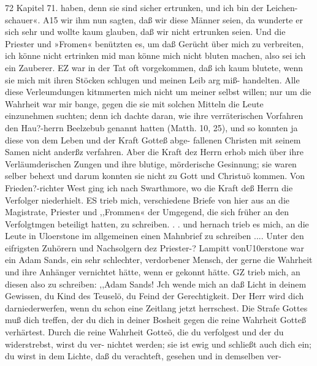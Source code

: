 72 Kapitel 71.
haben, denn sie sind sicher ertrunken, und ich bin der Leichen-
schauer«. A15 wir ihm nun sagten, daß wir diese Männer seien,
da wunderte er sich sehr und wollte kaum glauben, daß wir nicht
ertrunken seien. Und die Priester und »Fromen« benützten es, um
daß Gerücht über mich zu verbreiten, ich könne nicht ertrinken mid
man könne mich nicht bluten machen, also sei ich ein Zauberer.
EZ war in der Tat oft vorgekommen, daß ich kaum blutete, wenn
sie mich mit ihren Stöcken schlugen und meinen Leib arg miß-
handelten. Alle diese Verleumdungen kitmmerten mich nicht um
meiner selbst willen; nur um die Wahrheit war mir bange,
gegen die sie mit solchen Mitteln die Leute einzunehmen suchten;
denn ich dachte daran, wie ihre verräterischen Vorfahren den
Hau?-herrn Beelzebub genannt hatten (Matth. 10, 25), und so
konnten ja diese von dem Leben und der Kraft Gotteß abge-
fallenen Christen mit seinem Samen nicht anderßz verfahren. Aber
die Kraft dez Herrn erhob mich über ihre Verläumderischen Zungen
und ihre blutige, mörderische Gesinnung; sie waren selber behext
und darum konnten sie nicht zu Gott und Christuö kommen.
Von Frieden?-richter West ging ich nach Swarthmore, wo
die Kraft deß Herrn die Verfolger niederhielt. ES trieb mich,
verschiedene Briefe von hier aus an die Magistrate, Priester und
,,Frommen« der Umgegend, die sich früher an den Verfolgtmgen
beteiligt hatten, zu schreiben. . . und hernach trieb es mich, an
die Leute in Uloerstone im allgemeinen einen Mahnbrief zu
schreiben ....
Unter den eifrigsten Zuhörern und Nachsolgern dez Priester-?
Lampitt vonU10erstone war ein Adam Sands, ein sehr schlechter,
verdorbener Mensch, der gerne die Wahrheit und ihre Anhänger
vernichtet hätte, wenn er gekonnt hätte. GZ trieb mich, an diesen
also zu schreiben:
,,Adam Sands!
Jch wende mich an daß Licht in deinem Gewissen, du Kind
des Teuselö, du Feind der Gerechtigkeit. Der Herr wird dich
darniederwerfen, wenn du schon eine Zeitlang jetzt herrschest. Die
Strafe Gottes muß dich treffen, der du dich in deiner Bosheit gegen
die reine Wahrheit Gotteß verhärtest. Durch die reine Wahrheit
Gotteö, die du verfolgest und der du widerstrebst, wirst du ver-
nichtet werden; sie ist ewig und schließt auch dich ein; du wirst
in dem Lichte, daß du verachteft, gesehen und in demselben ver-


